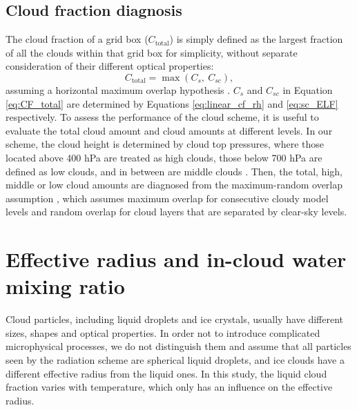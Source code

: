 \subsection{Cloud fraction diagnosis}
\label{sec:cld_amt_diag}
The cloud fraction of a grid box ($C_\mathrm{total}$) is simply defined as the largest fraction of all the clouds within that grid box for simplicity, without separate consideration of their different optical properties:
\begin{equation}
	C_\mathrm{total}=\max(C_s, ~C_{sc}),
	\label{eq:CF_total}
\end{equation}
assuming a horizontal maximum overlap hypothesis \citep[e.g.,][]{Collins2004, Roehrig2020}. $C_s$ and $C_{sc}$ in Equation \eqref{eq:CF_total} are determined by Equations \eqref{eq:linear_cf_rh} and \eqref{eq:sc_ELF} respectively. To assess the performance of the cloud scheme, it is useful to evaluate the total cloud amount and cloud amounts at different levels. In our scheme, the cloud height is determined by cloud top pressures, where those located above 400 hPa are treated as high clouds, those below 700 hPa are defined as low clouds, and in between are middle clouds \citep{Collins2004}. Then, the total, high, middle or low cloud amounts are diagnosed from the maximum-random overlap assumption \citep{Morcrette2000}, which assumes maximum overlap for consecutive cloudy model levels and random overlap for cloud layers that are separated by clear-sky levels.


\section{Effective radius and in-cloud water mixing ratio}

Cloud particles, including liquid droplets and ice crystals, usually have different sizes, shapes and optical properties. In order not to introduce complicated microphysical processes, we do not distinguish them and assume that all particles seen by the radiation scheme are spherical liquid droplets, and ice clouds have a different effective radius from the liquid ones. In this study, the liquid cloud fraction varies with temperature, which only has an influence on the effective radius. %


